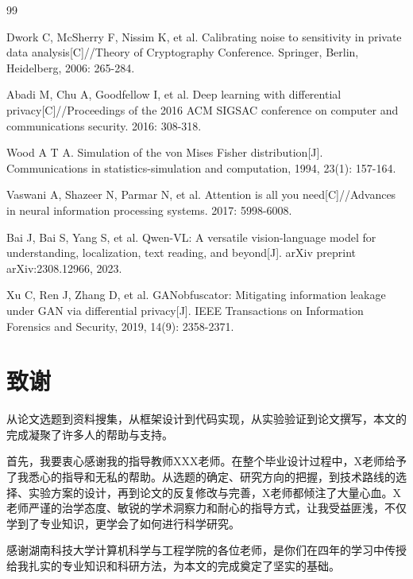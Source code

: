 \documentclass[a4paper,12pt]{article}
\begin{document}
\newpage
\begin{thebibliography}{99}

Dwork C, McSherry F, Nissim K, et al. Calibrating noise to sensitivity in private data analysis[C]//Theory of Cryptography Conference. Springer, Berlin, Heidelberg, 2006: 265-284.

Abadi M, Chu A, Goodfellow I, et al. Deep learning with differential privacy[C]//Proceedings of the 2016 ACM SIGSAC conference on computer and communications security. 2016: 308-318.

Wood A T A. Simulation of the von Mises Fisher distribution[J]. Communications in statistics-simulation and computation, 1994, 23(1): 157-164.

Vaswani A, Shazeer N, Parmar N, et al. Attention is all you need[C]//Advances in neural information processing systems. 2017: 5998-6008.

Bai J, Bai S, Yang S, et al. Qwen-VL: A versatile vision-language model for understanding, localization, text reading, and beyond[J]. arXiv preprint arXiv:2308.12966, 2023.

Xu C, Ren J, Zhang D, et al. GANobfuscator: Mitigating information leakage under GAN via differential privacy[J]. IEEE Transactions on Information Forensics and Security, 2019, 14(9): 2358-2371.

\end{thebibliography}

\newpage
\section*{致\quad 谢}

从论文选题到资料搜集，从框架设计到代码实现，从实验验证到论文撰写，本文的完成凝聚了许多人的帮助与支持。

首先，我要衷心感谢我的指导教师XXX老师。在整个毕业设计过程中，X老师给予了我悉心的指导和无私的帮助。从选题的确定、研究方向的把握，到技术路线的选择、实验方案的设计，再到论文的反复修改与完善，X老师都倾注了大量心血。X老师严谨的治学态度、敏锐的学术洞察力和耐心的指导方式，让我受益匪浅，不仅学到了专业知识，更学会了如何进行科学研究。

感谢湖南科技大学计算机科学与工程学院的各位老师，是你们在四年的学习中传授给我扎实的专业知识和科研方法，为本文的完成奠定了坚实的基础。
\end{document}
